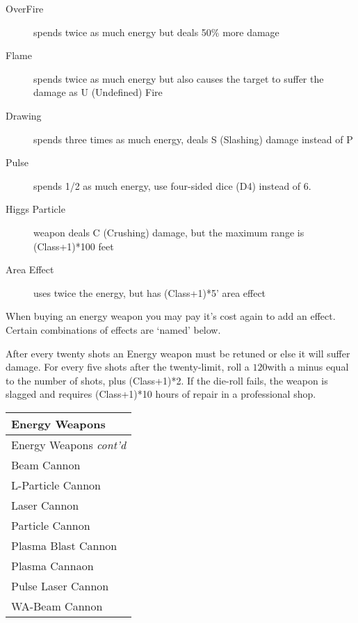 \documentclass[twoside]{book}
\begin{document}
\begin{description}
    
  \item[ OverFire ] 
    {  
     spends twice as much energy but deals 50\% more
                 damage 
    }
  
  \item[ Flame ] 
    {  
     spends twice as much energy but also causes the
                 target to suffer the damage as U (Undefined) Fire
                 
    }
  
  \item[ Drawing ] 
    {  
     spends three times as much energy, deals S
                 (Slashing) damage instead of P 
    }
  
  \item[ Pulse ] 
    {  
     spends 1/2 as much energy, use four-sided dice
                 (D4) instead of 6. 
    }
  
  \item[ Higgs Particle ] 
    {  
     weapon deals C (Crushing) damage, but the maximum
                 range is (Class+1)*100 feet 
    }
  
  \item[ Area Effect ] 
    {  
     uses twice the energy, but has (Class+1)*5'
                 area effect 
    }
  
\end{description}
  
    {  
     When buying an energy weapon you may pay it's
               cost again to add an effect. Certain combinations of
               effects are `named' below. 
    }
  
    {  
     After every twenty shots an Energy weapon must be
               retuned or else it will suffer damage. For every five
               shots after the twenty-limit, roll a \ensuremath{1}\ensuremath{20}\ensuremath{}with a minus
               equal to the number of shots, plus (Class+1)*2. If the
               die-roll fails, the weapon is slagged and requires
               (Class+1)*10 hours of repair in a professional shop.
               
    }
  
\begin{longtable}{p{1.25in}} 
  Energy Weapons\\
  \hline
  \hline
  \endfirsthead
  Energy Weapons \textit{cont'd}
         \\
  \hline
  \endhead
\raggedright  Beam Cannon\tabularnewline
      \raggedright  L-Particle Cannon\tabularnewline
      \raggedright  Laser Cannon\tabularnewline
      \raggedright  Particle Cannon\tabularnewline
      \raggedright  Plasma Blast Cannon\tabularnewline
      \raggedright  Plasma Cannaon\tabularnewline
      \raggedright  Pulse Laser Cannon\tabularnewline
      \raggedright  WA-Beam Cannon\tabularnewline
      
\end{longtable}
    
\end{document}
